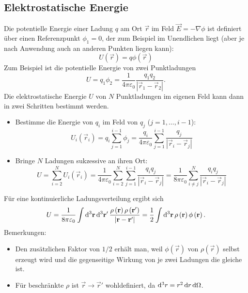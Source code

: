 \subsection{Elektrostatische Energie}

Die potentielle Energie einer Ladung $q$ am Ort $\vec {r}$ im Feld $\vec {E}=-\nabla \phi $ ist definiert über einen Referenzpunkt $\phi _{1}=0$, der zum Beispiel im Unendlichen liegt (aber je nach Anwendung auch an anderen Punkten liegen kann):
\begin{equation}
	\label{3.11}
	U\left(\vec {r}\right)=q\phi \left(\vec {r}\right)
\end{equation}
Zum Beispiel ist die potentielle Energie von zwei Punktladungen
\begin{equation*}
	U=q_{1}\phi _{2}=\frac{1}{4\pi \varepsilon _{0}}\frac{q_{1}q_{2}}{\left| \vec {r}_{1}-\vec {r}_{2}\right| }.
\end{equation*}
Die elektrostatische Energie $U$ von $N$ Punktladungen im eigenen Feld kann dann in zwei Schritten bestimmt werden.
\begin{itemize}
	\item Bestimme die Energie von $q_{i}$ im Feld von $q_{j}$ ($j=1,\ldots ,i-1$):
	      \begin{equation*}
		      U_{i}\left(\vec {r}_{i}\right)=q_{i}\sum _{j=1}^{i-1}\phi _{j}=\frac{q_{i}}{4\pi \varepsilon _{0}}\sum _{j=1}^{i-1}\frac{q_{j}}{\left| \vec {r}_{i}-\vec {r}_{j}\right| }
	      \end{equation*}
	\item Bringe $N$ Ladungen sukzessive an ihren Ort:
	      \begin{equation*}
		      U=\sum _{i=2}^{N}U_{i}\left(\vec {r}_{i}\right)=\frac{1}{4\pi \varepsilon _{0}}\sum _{i=2}^{N}\sum _{j=1}^{i-1}\frac{q_{i}q_{j}}{\left| \vec {r}_{i}-\vec {r}_{j}\right| }=\frac{1}{8\pi \varepsilon _{0}}\sum _{i\neq j}^{N}\frac{q_{i}q_{j}}{\left| \vec {r}_{i}-\vec {r}_{j}\right| }
	      \end{equation*}

\end{itemize}
Für eine kontinuierliche Ladungsverteilung ergibt sich
\begin{equation*}
	U=\frac{1}{8\pi \varepsilon _{0}}\int \diffa[3]{\vec{r}}\diffa[3]{\vec{r}'}\frac{\rho \left(\vec {r}\right)\rho \left(\vec {r}'\right)}{\left| \vec {r}-\vec {r}'\right| }=\frac{1}{2}\int \diffa[3]{\vec{r}}\rho \left(\vec {r}\right)\phi \left(\vec {r}\right).
\end{equation*}
Bemerkungen:
\begin{itemize}
	\item Den zusätzlichen Faktor von $1/2$ erhält man, weil $\phi \left(\vec {r}\right)$ von $\rho \left(\vec {r}\right)$ selbst erzeugt wird und die gegenseitige Wirkung von je zwei Ladungen die gleiche ist.

	\item Für beschränkte $\rho $ ist $\vec {r}\rightarrow \vec {r}'$ wohldefiniert, da $\diff ^{3}r=r^{2}\diff r\diff \Omega  $.


\end{itemize}
